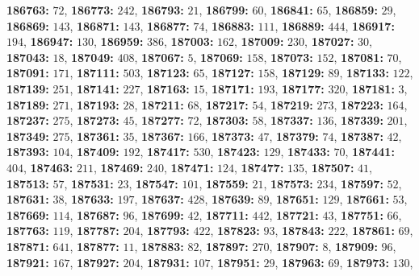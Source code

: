 \textsf{\bfseries 186763:} $72$, \textsf{\bfseries 186773:} $242$, \textsf{\bfseries 186793:} $21$, \textsf{\bfseries 186799:} $60$, \textsf{\bfseries 186841:} $65$, \textsf{\bfseries 186859:} $29$, \textsf{\bfseries 186869:} $143$, \textsf{\bfseries 186871:} $143$, \textsf{\bfseries 186877:} $74$, \textsf{\bfseries 186883:} $111$, \textsf{\bfseries 186889:} $444$, \textsf{\bfseries 186917:} $194$, \textsf{\bfseries 186947:} $130$, \textsf{\bfseries 186959:} $386$, \textsf{\bfseries 187003:} $162$, \textsf{\bfseries 187009:} $230$, \textsf{\bfseries 187027:} $30$, \textsf{\bfseries 187043:} $18$, \textsf{\bfseries 187049:} $408$, \textsf{\bfseries 187067:} $5$, \textsf{\bfseries 187069:} $158$, \textsf{\bfseries 187073:} $152$, \textsf{\bfseries 187081:} $70$, \textsf{\bfseries 187091:} $171$, \textsf{\bfseries 187111:} $503$, \textsf{\bfseries 187123:} $65$, \textsf{\bfseries 187127:} $158$, \textsf{\bfseries 187129:} $89$, \textsf{\bfseries 187133:} $122$, \textsf{\bfseries 187139:} $251$, \textsf{\bfseries 187141:} $227$, \textsf{\bfseries 187163:} $15$, \textsf{\bfseries 187171:} $193$, \textsf{\bfseries 187177:} $320$, \textsf{\bfseries 187181:} $3$, \textsf{\bfseries 187189:} $271$, \textsf{\bfseries 187193:} $28$, \textsf{\bfseries 187211:} $68$, \textsf{\bfseries 187217:} $54$, \textsf{\bfseries 187219:} $273$, \textsf{\bfseries 187223:} $164$, \textsf{\bfseries 187237:} $275$, \textsf{\bfseries 187273:} $45$, \textsf{\bfseries 187277:} $72$, \textsf{\bfseries 187303:} $58$, \textsf{\bfseries 187337:} $136$, \textsf{\bfseries 187339:} $201$, \textsf{\bfseries 187349:} $275$, \textsf{\bfseries 187361:} $35$, \textsf{\bfseries 187367:} $166$, \textsf{\bfseries 187373:} $47$, \textsf{\bfseries 187379:} $74$, \textsf{\bfseries 187387:} $42$, \textsf{\bfseries 187393:} $104$, \textsf{\bfseries 187409:} $192$, \textsf{\bfseries 187417:} $530$, \textsf{\bfseries 187423:} $129$, \textsf{\bfseries 187433:} $70$, \textsf{\bfseries 187441:} $404$, \textsf{\bfseries 187463:} $211$, \textsf{\bfseries 187469:} $240$, \textsf{\bfseries 187471:} $124$, \textsf{\bfseries 187477:} $135$, \textsf{\bfseries 187507:} $41$, \textsf{\bfseries 187513:} $57$, \textsf{\bfseries 187531:} $23$, \textsf{\bfseries 187547:} $101$, \textsf{\bfseries 187559:} $21$, \textsf{\bfseries 187573:} $234$, \textsf{\bfseries 187597:} $52$, \textsf{\bfseries 187631:} $38$, \textsf{\bfseries 187633:} $197$, \textsf{\bfseries 187637:} $428$, \textsf{\bfseries 187639:} $89$, \textsf{\bfseries 187651:} $129$, \textsf{\bfseries 187661:} $53$, \textsf{\bfseries 187669:} $114$, \textsf{\bfseries 187687:} $96$, \textsf{\bfseries 187699:} $42$, \textsf{\bfseries 187711:} $442$, \textsf{\bfseries 187721:} $43$, \textsf{\bfseries 187751:} $66$, \textsf{\bfseries 187763:} $119$, \textsf{\bfseries 187787:} $204$, \textsf{\bfseries 187793:} $422$, \textsf{\bfseries 187823:} $93$, \textsf{\bfseries 187843:} $222$, \textsf{\bfseries 187861:} $69$, \textsf{\bfseries 187871:} $641$, \textsf{\bfseries 187877:} $11$, \textsf{\bfseries 187883:} $82$, \textsf{\bfseries 187897:} $270$, \textsf{\bfseries 187907:} $8$, \textsf{\bfseries 187909:} $96$, \textsf{\bfseries 187921:} $167$, \textsf{\bfseries 187927:} $204$, \textsf{\bfseries 187931:} $107$, \textsf{\bfseries 187951:} $29$, \textsf{\bfseries 187963:} $69$, \textsf{\bfseries 187973:} $130$, 
